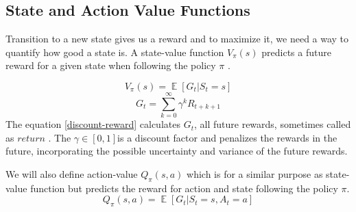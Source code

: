     \subsection{State and Action Value Functions}
        Transition to a new state gives us a reward and to maximize it, we need a way to quantify how good a state is. A state-value function $V_{\pi}(s)$ predicts a future reward for a given state when following the policy $\pi$ \cite{rl-intro}. 
    
        \begin{equation}
            V_{\pi}(s) = \mathop{\mathbb{E}}[G_t|S_t = s]
        \end{equation}
        \begin{equation}\label{discount-reward}
            G_t = \sum_{k=0}^{\infty} \gamma^k R_{t+k+1}
        \end{equation}
        The equation \ref{discount-reward} calculates $G_t$, all future rewards, sometimes called as $return$ \cite{rl-intro}. The $\gamma \in [0,1]$is a discount factor and penalizes the rewards in the future, incorporating the possible uncertainty and variance of the future rewards.
    
        We will also define action-value $Q_{\pi}(s, a)$ which is for a similar purpose as state-value function but predicts the reward for action and state following the policy $\pi$.
        \begin{equation}
            Q_{\pi}(s, a) = \mathop{\mathbb{E}}[G_t|S_t = s, A_t = a]
        \end{equation}
        
